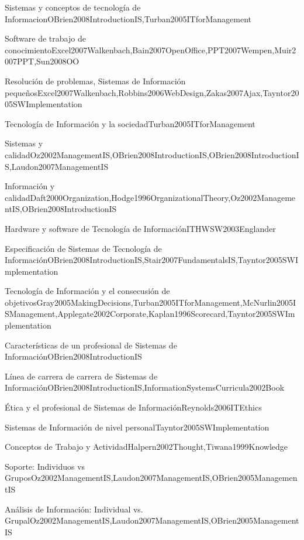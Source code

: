 \begin{LU1}{Sistemas y conceptos de tecnología de Informacion}{OBrien2008IntroductionIS,Turban2005ITforManagement}{}
\begin{LU2}{Software de trabajo de conocimiento}{Excel2007Walkenbach,Bain2007OpenOffice,PPT2007Wempen,Muir2007PPT,Sun2008OO}{}
\begin{LU3}{Resolución de problemas, Sistemas de Información pequeños}{Excel2007Walkenbach,Robbins2006WebDesign,Zakas2007Ajax,Tayntor2005SWImplementation}{}
\begin{LU4}{Tecnología de Información y la sociedad}{Turban2005ITforManagement}{}
\begin{LU5}{Sistemas y calidad}{Oz2002ManagementIS,OBrien2008IntroductionIS,OBrien2008IntroductionIS,Laudon2007ManagementIS}{}
\begin{LU6}{Información y calidad}{Daft2000Organization,Hodge1996OrganizationalTheory,Oz2002ManagementIS,OBrien2008IntroductionIS}{}
\begin{LU7}{Hardware y software de Tecnología de Información}{ITHWSW2003Englander}{}
\begin{LU8}{Especificación de Sistemas de Tecnología de Información}{OBrien2008IntroductionIS,Stair2007FundamentalsIS,Tayntor2005SWImplementation}{}
\begin{LU9}{Tecnología de Información y el consecusión de objetivos}{Gray2005MakingDecisions,Turban2005ITforManagement,McNurlin2005ISManagement,Applegate2002Corporate,Kaplan1996Scorecard,Tayntor2005SWImplementation}{}
\begin{LU10}{Características de un profesional de Sistemas de Información}{OBrien2008IntroductionIS}{}
\begin{LU11}{Línea de carrera de carrera de Sistemas de Información}{OBrien2008IntroductionIS,InformationSystemsCurricula2002Book}{}
\begin{LU12}{Ética y el profesional de Sistemas de Información}{Reynolds2006ITEthics}{}
\begin{LU13}{Sistemas de Información de nivel personal}{Tayntor2005SWImplementation}{}
\begin{LU13.01}[LU13]{Conceptos de Trabajo y Actividad}{Halpern2002Thought,Tiwana1999Knowledge}{}
\begin{LU13.02}[LU13]{Soporte: Individuos vs Grupos}{Oz2002ManagementIS,Laudon2007ManagementIS,OBrien2005ManagementIS}{}
\begin{LU13.03}[LU13]{Análisis de Información: Individual vs. Grupal}{Oz2002ManagementIS,Laudon2007ManagementIS,OBrien2005ManagementIS}{}
\end{LU13.03}
\end{LU13.02}
\end{LU13.01}
\end{LU13}
\end{LU12}
\end{LU11}
\end{LU10}
\end{LU9}
\end{LU8}
\end{LU7}
\end{LU6}
\end{LU5}
\end{LU4}
\end{LU3}
\end{LU2}
\end{LU1}
